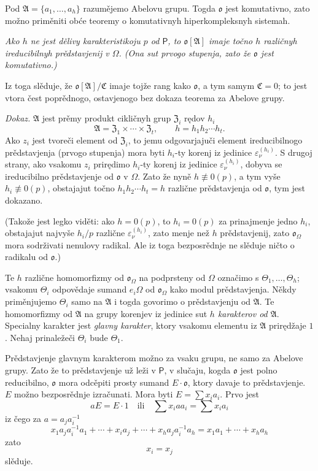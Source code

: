\documentclass[11pt]{article}
\begin{document}
Pod \(\mathfrak A=\{a_1,\ldots,a_h\}\) razumějemo Abelovu grupu. Togda \(\mathfrak o\) jest komutativno, zato možno priměniti obće teoremy o komutativnyh hiperkompleksnyh sistemah.

\emph{Ako \(h\) ne jest dělivy karakteristikoju \(p\) od \(\mathsf P\), to \(\mathfrak o[\mathfrak A]\) imaje točno \(h\) različnyh ireducibilnyh prědstavjenij v \(\Omega\). (Ona sut prvogo stupenja, zato že \(\mathfrak o\) jest komutativno.)}

Iz toga slěduje, že \(\mathfrak o[\mathfrak A]/\mathfrak C\) imaje tojže rang kako \(\mathfrak o\), a tym samym \(\mathfrak C=0\); to jest vtora čest poprědnogo, ostavjenogo bez dokaza teorema za Abelove grupy.

\emph{Dokaz.} \(\mathfrak A\) jest prěmy produkt cikličnyh grup \(\mathfrak Z_i\) rędov \(h_i\)
\[
\mathfrak A=\mathfrak Z_1\times\cdots\times\mathfrak Z_t,\qquad
h=h_1h_2\cdots h_t .
\]
Ako \(z_i\) jest tvoreči element od \(\mathfrak Z_i\), to jemu odgovarjajuči element ireducibilnogo prědstavjenja (prvogo stupenja) mora byti \(h_i\)-ty korenj iz jedinice \(\varepsilon_\nu^{(h_i)}\). S drugoj strany, ako vsakomu \(z_i\) prirędimo \(h_i\)-ty korenj iz jedinice \(\varepsilon_\nu^{(h_i)}\), dobyva se ireducibilno prědstavjenje od \(\mathfrak o\) v \(\Omega\). Zato že nyně \(h\not\equiv0(p)\), a tym vyše \(h_i\not\equiv0(p)\), obstajajut točno \(h_1h_2\cdots h_t=h\) različne prědstavjenja od \(\mathfrak o\), tym jest dokazano.

(Takože jest legko viděti: ako \(h=0(p)\), to \(h_i=0(p)\) za prinajmenje jedno \(h_i\), obstajajut najvyše \(h_i/p\) različne \(\varepsilon_\nu^{(h_i)}\), zato menje než \(h\) prědstavjenij, zato \(\mathfrak o_\Omega\) mora sodrživati nenulovy radikal. Ale iz toga bezposrědnje ne slěduje ničto o radikalu od \(\mathfrak o\).)

Te \(h\) različne homomorfizmy od \(\mathfrak o_\Omega\) na podprsteny od \(\Omega\) označimo s \(\Theta_1,\ldots,\Theta_h\); vsakomu \(\Theta_i\) odpovědaje sumand \(e_i\Omega\) od \(\mathfrak o_\Omega\) kako modul prědstavjenja. Někdy priměnjujemo \(\Theta_i\) samo na \(\mathfrak A\) i togda govorimo o prědstavjenju od \(\mathfrak A\). Te homomorfizmy od \(\mathfrak A\) na grupy korenjev iz jedinice sut \emph{\(h\) karakterov od \(\mathfrak A\)}. Specialny karakter jest \emph{glavny karakter}, ktory vsakomu elementu iz \(\mathfrak A\) prirędžaje \(1\). Nehaj prinaležeči \(\Theta_i\) bude \(\Theta_1\).

Prědstavjenje glavnym karakterom možno za vsaku grupu, ne samo za Abelove grupy. Zato že to prědstavjenje už leži v \(\mathsf P\), v slučaju, kogda \(\mathfrak o\) jest polno reducibilno, \(\mathfrak o\) mora odcěpiti prosty sumand \(E\cdot\mathfrak o\), ktory davaje to prědstavjenje. \(E\) možno bezposrědnje izračunati. Mora byti \(E=\sum x_i a_i\). Prvo jest
\[
aE=E\cdot 1\quad\text{ili}\quad \sum x_i a a_i=\sum x_i a_i
\]
iz čego za \(a=a_j a_i^{-1}\)
\[
x_1a_ja_i^{-1}a_1+\cdots+x_i a_j+\cdots+x_ha_ja_i^{-1}a_h
=x_1a_1+\cdots+x_ha_h
\]
zato
\[
x_i=x_j
\]
slěduje.
\end{document}
